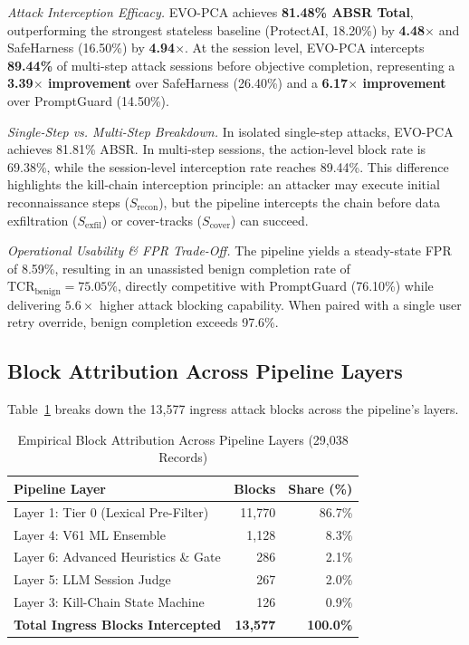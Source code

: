 \documentclass[conference]{IEEEtran}
\begin{document}
\textit{Attack Interception Efficacy.} EVO-PCA achieves \textbf{81.48\% ABSR Total}, outperforming the strongest stateless baseline (ProtectAI, 18.20\%) by \textbf{4.48$\times$} and SafeHarness (16.50\%) by \textbf{4.94$\times$}. At the session level, EVO-PCA intercepts \textbf{89.44\%} of multi-step attack sessions before objective completion, representing a \textbf{3.39$\times$ improvement} over SafeHarness (26.40\%) and a \textbf{6.17$\times$ improvement} over PromptGuard (14.50\%).

\textit{Single-Step vs. Multi-Step Breakdown.} In isolated single-step attacks, EVO-PCA achieves 81.81\% ABSR. In multi-step sessions, the action-level block rate is 69.38\%, while the session-level interception rate reaches 89.44\%. This difference highlights the kill-chain interception principle: an attacker may execute initial reconnaissance steps ($S_{\text{recon}}$), but the pipeline intercepts the chain before data exfiltration ($S_{\text{exfil}}$) or cover-tracks ($S_{\text{cover}}$) can succeed.

\textit{Operational Usability \& FPR Trade-Off.} The pipeline yields a steady-state FPR of 8.59\%, resulting in an unassisted benign completion rate of $\text{TCR}_{\text{benign}} = 75.05\%$, directly competitive with PromptGuard (76.10\%) while delivering $5.6\times$ higher attack blocking capability. When paired with a single user retry override, benign completion exceeds 97.6\%.

\subsection{Block Attribution Across Pipeline Layers}
Table~\ref{tab:attribution} breaks down the 13,577 ingress attack blocks across the pipeline's layers.

\begin{table}[t]
\caption{Empirical Block Attribution Across Pipeline Layers (29,038 Records)}
\label{tab:attribution}
\centering
\begin{tabular}{lrr}
\toprule
\textbf{Pipeline Layer} & \textbf{Blocks} & \textbf{Share (\%)} \\
\midrule
Layer 1: Tier 0 (Lexical Pre-Filter) & 11,770 & 86.7\% \\
Layer 4: V61 ML Ensemble & 1,128 & 8.3\% \\
Layer 6: Advanced Heuristics \& Gate & 286 & 2.1\% \\
Layer 5: LLM Session Judge & 267 & 2.0\% \\
Layer 3: Kill-Chain State Machine & 126 & 0.9\% \\
\midrule
\textbf{Total Ingress Blocks Intercepted} & \textbf{13,577} & \textbf{100.0\%} \\
\bottomrule
\end{tabular}
\end{table}
\end{document}
